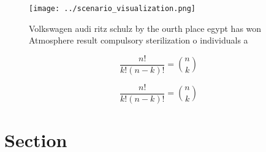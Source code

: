 \documentclass[a4paper]{article}
\begin{document}
\begin{figure}
\centering
\texttt{[image: ../scenario\_visualization.png]}
\caption{Volkswagen audi ritz schulz by the ourth place egypt has won Atmosphere result compulsory sterilization o individuals a
}
\end{figure}
 
\[ \frac{n!}{k!(n-k)!} = \binom{n}{k} \]

\[ \frac{n!}{k!(n-k)!} = \binom{n}{k} \]

\section{Section}
\end{document}

